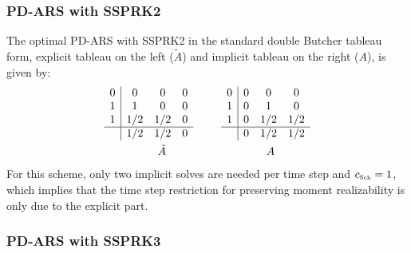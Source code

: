 \subsubsection{PD-ARS with SSPRK2}

The optimal PD-ARS with SSPRK2 in the standard double Butcher tableau form, explicit tableau on the left ($\tilde{A}$) and implicit tableau on the right ($A$), is given by:
\begin{align}
  &\begin{array}{c | c c c}
  	0 & 0   & 0 & 0 \\
  	1 & 1   & 0 & 0 \\
  	1 & 1/2 & 1/2 & 0 \\ \hline
  	  & 1/2 & 1/2 & 0 
  \end{array}
  \qquad
  \begin{array}{c | c c c}
  	0 & 0 & 0            & 0            \\
  	1 & 0 & 1            & 0            \\
  	1 & 0 & 1/2 & 1/2 \\ \hline
  	  & 0 & 1/2 & 1/2
  \end{array} \\ 
  &\hspace{48pt} \tilde{A} \hspace{90pt} A
\end{align}
For this scheme, only two implicit solves are needed per time step and $c_{\mbox{\tiny Sch}}= 1$, which implies that the time step restriction for preserving moment realizability is only due to the explicit part.  

\subsubsection{PD-ARS with SSPRK3}

